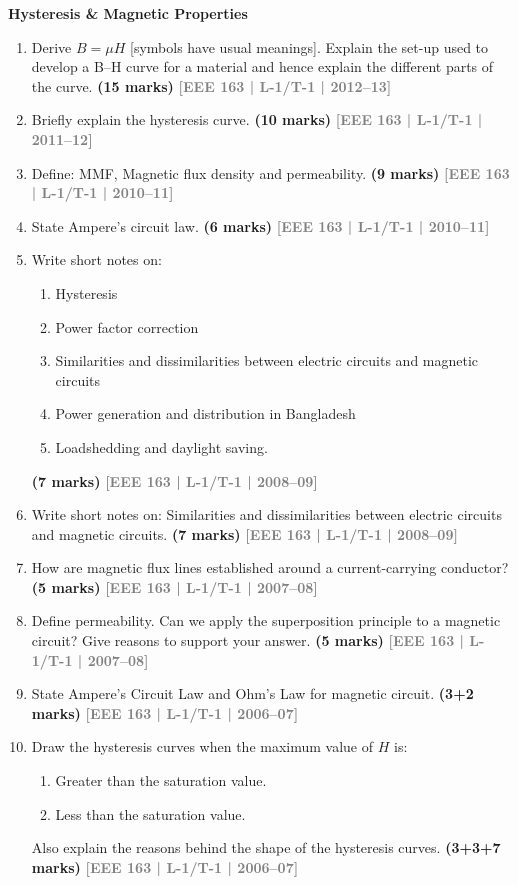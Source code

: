\documentclass[12pt,a3paper]{article}
\newcommand{\yr}[1]{\hfill\textcolor{gray}{\small\textbf{[#1]}}}
\newcommand{\mk}[1]{\textcolor{orange!70!black}{\small\textbf{(#1 marks)}}}
\newcommand{\subtopic}[2]{%
  \vspace{10pt}
  \noindent\begin{tcolorbox}[colback=#1!8,colframe=#1,boxrule=0.6pt,arc=4pt,
    left=6pt,right=6pt,top=4pt,bottom=4pt]
    \small\bfseries\textcolor{#1}{#2}
  \end{tcolorbox}
  \vspace{2pt}
}
\begin{document}
\subtopic{cD}{Hysteresis \& Magnetic Properties}
\label{sub:s5-hysteresis}

\begin{enumerate}\item Derive $B = \mu H$ [symbols have usual meanings]. Explain the set-up used to develop a B--H curve for a material and hence explain the different parts of the curve.
\mk{15} \yr{EEE 163 | L-1/T-1 | 2012--13}

\item Briefly explain the hysteresis curve.
\mk{10} \yr{EEE 163 | L-1/T-1 | 2011--12}

\item Define: MMF, Magnetic flux density and permeability.
\mk{9} \yr{EEE 163 | L-1/T-1 | 2010--11}

\item State Ampere's circuit law.
\mk{6} \yr{EEE 163 | L-1/T-1 | 2010--11}

\item Write short notes on: 
\begin{enumerate}
  \item Hysteresis
  \item Power factor correction
  \item Similarities and dissimilarities between electric circuits and magnetic circuits
  \item Power generation and distribution in Bangladesh
  \item Loadshedding and daylight saving.
\end{enumerate}
\mk{7} \yr{EEE 163 | L-1/T-1 | 2008--09}

\item Write short notes on: Similarities and dissimilarities between electric circuits and magnetic circuits.
\mk{7} \yr{EEE 163 | L-1/T-1 | 2008--09}

\item How are magnetic flux lines established around a current-carrying conductor?
\mk{5} \yr{EEE 163 | L-1/T-1 | 2007--08}

\item Define permeability. Can we apply the superposition principle to a magnetic circuit? Give reasons to support your answer.
\mk{5} \yr{EEE 163 | L-1/T-1 | 2007--08}

\item State Ampere's Circuit Law and Ohm's Law for magnetic circuit.
\mk{3+2} \yr{EEE 163 | L-1/T-1 | 2006--07}

\item Draw the hysteresis curves when the maximum value of $H$ is:
\begin{enumerate}
  \item Greater than the saturation value.
  \item Less than the saturation value.
\end{enumerate}
Also explain the reasons behind the shape of the hysteresis curves.
\mk{3+3+7} \yr{EEE 163 | L-1/T-1 | 2006--07}

\end{enumerate}
\end{document}
